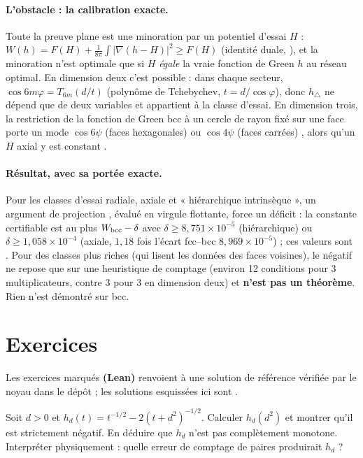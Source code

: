 \paragraph{L'obstacle : la calibration exacte.} Toute la preuve plane est une minoration par un potentiel d'essai $H$ :
$W(h)=F(H)+\frac1{8\pi}\int|\nabla(h-H)|^2\ge F(H)$ (identité duale, \tierC), et la minoration n'est optimale que si
$H$ \emph{égale} la vraie fonction de Green $h$ au réseau optimal. En dimension deux c'est possible : dans chaque secteur,
$\cos6m\varphi=T_{6m}(d/t)$ (polynôme de Tchebychev, $t=d/\cos\varphi$), donc $h_\triangle$ ne dépend que de deux
variables et appartient à la classe d'essai. En dimension trois, la restriction de la fonction de Green bcc à un cercle
de rayon fixé sur une face porte un mode $\cos6\psi$ (faces hexagonales) ou $\cos4\psi$ (faces carrées) \tierX, alors
qu'un $H$ axial y est constant \tierC.

\paragraph{Résultat, avec sa portée exacte.} Pour les classes d'essai radiale, axiale et « hiérarchique intrinsèque »,
un argument de projection \tierC, évalué en virgule flottante, force un déficit : la constante certifiable est au plus
$W_{\rm bcc}-\delta$ avec $\delta\ge8{,}751\times10^{-5}$ (hiérarchique) ou $\delta\ge1{,}058\times10^{-4}$ (axiale,
$1{,}18$ fois l'écart fcc--bcc $8{,}969\times10^{-5}$) ; ces valeurs sont \tierX. Pour des classes plus riches (qui lisent
les données des faces voisines), le négatif ne repose que sur une heuristique de comptage (environ 12 conditions pour 3
multiplicateurs, contre 3 pour 3 en dimension deux) \tierC{} et \textbf{n'est pas un théorème}. Rien n'est démontré sur
bcc.

\section{Exercices}\label{ch2:sec:ex}

Les exercices marqués \textbf{(Lean)} renvoient à une solution de référence vérifiée par le noyau dans le dépôt
\tierA{} ; les solutions esquissées ici sont \tierC.

\begin{exercise}\label{ch2:ex:hd}
Soit $d>0$ et $h_d(t)=t^{-1/2}-2(t+d^2)^{-1/2}$. Calculer $h_d(d^2)$ et montrer qu'il est strictement négatif. En
déduire que $h_d$ n'est pas complètement monotone. Interpréter physiquement : quelle erreur de comptage de paires
produirait $h_d$ ?
\end{exercise}

